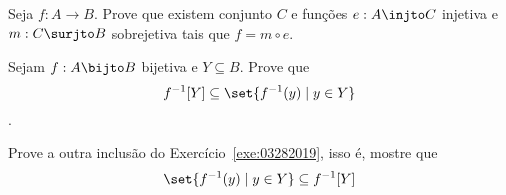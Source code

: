 \begin{exercise}
    Seja $f: A \to B$. Prove que existem conjunto $C$ e funções $e:A \injto C$ injetiva e $m:C \surjto B$ sobrejetiva tais que $f = m \circ e$.
\end{exercise}

\begin{exercise}
    \label{exe:03282019}
    Sejam $f: A\bijto B$ bijetiva e $Y \subseteq B$. Prove que $$f^{-1}[Y] \subseteq \set{f^{-1}(y) \mid y \in Y}$$.
\end{exercise}

\begin{homework}
    Prove a outra inclusão do Exercício~\ref{exe:03282019}, isso é, mostre que $$ \set{f^{-1}(y) \mid y \in Y} \subseteq f^{-1}[Y]$$
\end{homework}